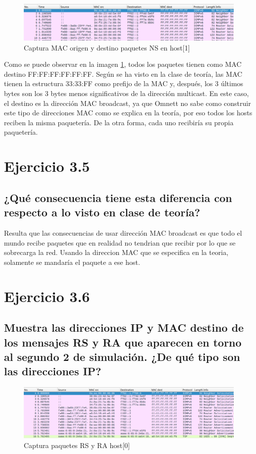 \begin{figure}[H]
    \centering
    \includegraphics[width=135mm, scale=0.75]{imaxes/captura_ejer3_4.png}
    \caption{Captura MAC origen y destino paquetes NS en host[1]}
    \label{fig:ip_mac_host1}
\end{figure}

Como se puede observar en la imagen \ref{fig:ip_mac_host1}, todos los paquetes tienen como MAC destino FF:FF:FF:FF:FF:FF. Según se ha visto en la clase de teoría, las MAC tienen la estructura 33:33:FF como prefijo de la MAC y, después, los 3 últimos bytes son los 3 bytes menos significativos de la dirección multicast. En este caso, el destino es la dirección MAC broadcast, ya que Omnett no sabe como construir este tipo de direcciones MAC como se explica en la teoría, por eso todos los hosts reciben la misma paquetería. De la otra forma, cada uno recibiría su propia paquetería.

\section{Ejercicio 3.5}
\subsection{¿Qué consecuencia tiene esta diferencia con respecto a lo visto en clase de teoría?}

Resulta que las consecuencias de usar dirección MAC broadcast es que todo el mundo recibe paquetes que en realidad no tendrian que recibir por lo que se sobrecarga la red. Usando la direccion MAC que se especifica en la teoria, solamente se mandaría el paquete a ese host.

\section{Ejercicio 3.6} 
\subsection{Muestra las direcciones IP y MAC destino de los mensajes RS y RA que aparecen en torno al segundo 2 de
simulación. ¿De qué tipo son las direcciones IP?}

\begin{figure}[H]
    \centering
    \includegraphics[width=135mm, scale=0.75]{imaxes/captura_ejer3_6.png}
    \caption{Captura paquetes RS y RA host[0]}
    \label{fig:rs_ra_h1}
\end{figure}

